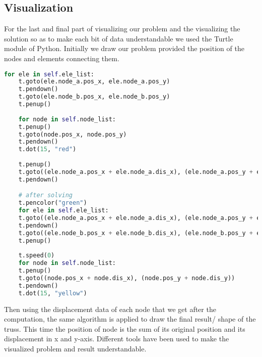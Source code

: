 \subsection*{Visualization}
For the last and final part of visualizing our problem and the visualizing the solution so as to make each bit of data understandable we used the Turtle module of Python. Initially we draw our problem provided the position of the nodes and elements connecting them.

\begin{lstlisting}[language=Python , basicstyle=\linespread{0.75}\listingsfont]
	for ele in self.ele_list:
	t.goto(ele.node_a.pos_x, ele.node_a.pos_y)
	t.pendown()
	t.goto(ele.node_b.pos_x, ele.node_b.pos_y)
	t.penup()
	
	for node in self.node_list:
	t.penup()
	t.goto(node.pos_x, node.pos_y)
	t.pendown()
	t.dot(15, "red")
	
	t.penup()
	t.goto((ele.node_a.pos_x + ele.node_a.dis_x), (ele.node_a.pos_y + ele.node_a.dis_y))
	t.pendown()

	# after solving
	t.pencolor("green")
	for ele in self.ele_list:
	t.goto((ele.node_a.pos_x + ele.node_a.dis_x), (ele.node_a.pos_y + ele.node_a.dis_y))
	t.pendown()
	t.goto((ele.node_b.pos_x + ele.node_b.dis_x), (ele.node_b.pos_y + ele.node_b.dis_y))
	t.penup()
	
	t.speed(0)
	for node in self.node_list:
	t.penup()
	t.goto((node.pos_x + node.dis_x), (node.pos_y + node.dis_y))
	t.pendown()
	t.dot(15, "yellow")

\end{lstlisting}

 Then using the displacement data of each node that we get after the computation, the same algorithm is applied to draw the final result/ shape of the truss. This time the position of node is the sum of its original position and its displacement in x and y-axis. Different tools have been used to make the visualized problem and result understandable.\\

